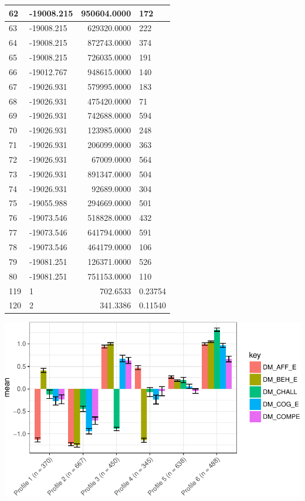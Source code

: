 \documentclass[]{book}
\theoremstyle{definition}
\theoremstyle{definition}
\theoremstyle{definition}
\theoremstyle{remark}
\begin{document}
\begin{tabular}{l|l|r|l}
\hline
62 & -19008.215 & 950604.0000 & 172\\
\hline
63 & -19008.215 & 629320.0000 & 222\\
\hline
64 & -19008.215 & 872743.0000 & 374\\
\hline
65 & -19008.215 & 726035.0000 & 191\\
\hline
66 & -19012.767 & 948615.0000 & 140\\
\hline
67 & -19026.931 & 579995.0000 & 183\\
\hline
68 & -19026.931 & 475420.0000 & 71\\
\hline
69 & -19026.931 & 742688.0000 & 594\\
\hline
70 & -19026.931 & 123985.0000 & 248\\
\hline
71 & -19026.931 & 206099.0000 & 363\\
\hline
72 & -19026.931 & 67009.0000 & 564\\
\hline
73 & -19026.931 & 891347.0000 & 504\\
\hline
74 & -19026.931 & 92689.0000 & 304\\
\hline
75 & -19055.988 & 294669.0000 & 501\\
\hline
76 & -19073.546 & 518828.0000 & 432\\
\hline
77 & -19073.546 & 641794.0000 & 591\\
\hline
78 & -19073.546 & 464179.0000 & 106\\
\hline
79 & -19081.251 & 126371.0000 & 526\\
\hline
80 & -19081.251 & 751153.0000 & 110\\
\hline
119 & 1 & 702.6533 & 0.23754\\
\hline
120 & 2 & 341.3386 & 0.11540\\
\hline
\end{tabular}

\begin{center}\includegraphics[width=0.8\linewidth]{rosenberg-dissertation_files/figure-latex/spec-solutions-m1_6-1} \end{center}
\end{document}
